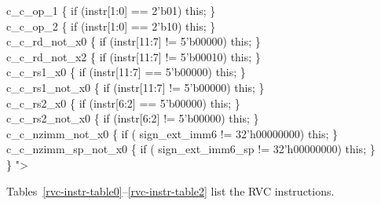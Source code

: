 {\indent c\_c\_op\_1 \{ if (instr[1:0] == 2'b01) this; \}\\%
\indent c\_c\_op\_2 \{ if (instr[1:0] == 2'b10) this; \}\\%
\indent c\_c\_rd\_not\_x0 \{ if (instr[11:7] != 5'b00000) this; \}\\%
\indent c\_c\_rd\_not\_x2 \{ if (instr[11:7] != 5'b00010) this; \}\\%
\indent c\_c\_rs1\_x0 \{ if (instr[11:7] == 5'b00000) this; \}\\%
\indent c\_c\_rs1\_not\_x0 \{ if (instr[11:7] != 5'b00000) this; \}\\%
\indent c\_c\_rs2\_x0 \{ if (instr[6:2] == 5'b00000) this; \}\\%
\indent c\_c\_rs2\_not\_x0 \{ if (instr[6:2] != 5'b00000) this; \}\\%
\indent c\_c\_nzimm\_not\_x0 \{ if ( sign\_ext\_imm6 != 32'h00000000) this; \}\\%
\indent c\_c\_nzimm\_sp\_not\_x0 \{ if ( sign\_ext\_imm6\_sp != 32'h00000000) this; \}\\%
\} "\textgreater\\%
}

Tables~\ref{rvc-instr-table0}--\ref{rvc-instr-table2} list the RVC instructions.


